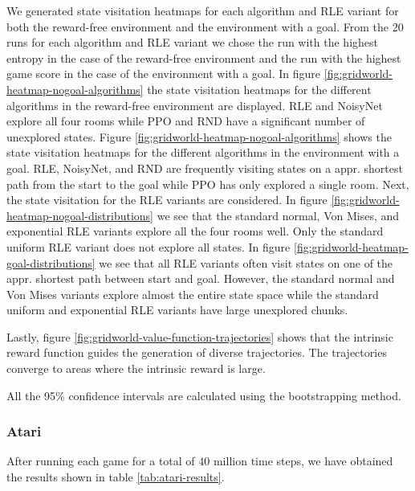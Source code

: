 \documentclass[10pt]{article} %
\begin{document}
We generated state visitation heatmaps for each algorithm and RLE variant for both the reward-free environment and the environment with a goal. From the 20 runs for each algorithm and RLE variant we chose the run with the highest entropy in the case of the reward-free environment and the run with the highest game score in the case of the environment with a goal. In figure \ref{fig:gridworld-heatmap-nogoal-algorithms} the state visitation heatmaps for the different algorithms in the reward-free environment are displayed. RLE and NoisyNet explore all four rooms while PPO and RND have a significant number of unexplored states. Figure \ref{fig:gridworld-heatmap-nogoal-algorithms} shows the state visitation heatmaps for the different algorithms in the environment with a goal. RLE, NoisyNet, and RND are frequently visiting states on a appr. shortest path from the start to the goal while PPO has only explored a single room. Next, the state visitation for the RLE variants are considered. In figure \ref{fig:gridworld-heatmap-nogoal-distributions} we see that the standard normal, Von Mises, and exponential RLE variants explore all the four rooms well. Only the standard uniform RLE variant does not explore all states. In figure \ref{fig:gridworld-heatmap-goal-distributions} we see that all RLE variants often visit states on one of the appr. shortest path between start and goal. However, the standard normal and Von Mises variants explore almost the entire state space while the standard uniform and exponential RLE variants have large unexplored chunks.

Lastly, figure \ref{fig:gridworld-value-function-trajectories} shows that the intrinsic reward function guides the generation of diverse trajectories. The trajectories converge to areas where the intrinsic reward is large. 

All the 95\% confidence intervals are calculated using the bootstrapping method. 

\subsubsection{Atari}

\noindent After running each game for a total of $40$ million time steps, we have obtained the results shown in table \ref{tab:atari-results}.
\end{document}
